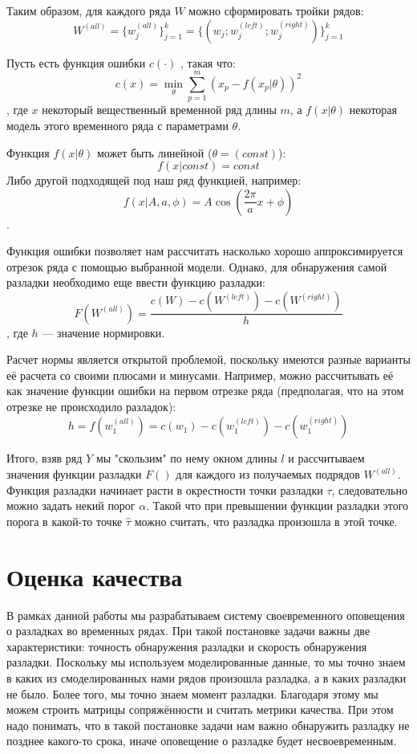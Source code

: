 \documentclass[%
12pt,
master,  %
natbib,      %
subf,        %
substylefile = spbu.rtx,
href,        %
colorlinks,  %
]{disser}
\begin{document}
Таким образом, для каждого ряда $W$ можно сформировать тройки рядов: 
$$ W^{(all)} = \{w_j^{(all)} \}_{j=1}^k =  \{(w_j; w_j^{(left)}; w_j^{(right)}) \}_{j=1}^k  $$

Пусть есть функция ошибки $c(\cdot)$ , такая что:
$$c(x) = \min_{\theta}{\sum_{p=1}^m(x_p - f(x_p | \theta))^2 }$$
, где $x$ некоторый вещественный временной ряд длины $m$, а $f(x | \theta)$ некоторая модель этого временного ряда с параметрами $\theta$.

Функция $f(x|\theta)$ может быть линейной ($\theta = (const)$):
$$ f(x | const) = const $$
Либо другой подходящей под наш ряд функцией, например:
$$ f(x | A, a, \phi) = A\cos(\frac{2\pi}{a}x + \phi) $$.

Функция ошибки позволяет нам рассчитать насколько хорошо аппроксимируется отрезок ряда с помощью выбранной модели. Однако, для обнаружения самой разладки необходимо еще ввести функцию разладки:
$$ F(W^{(all)}) = \frac{c(W) - c(W^{(left)}) - c(W^{(right)})}{h} $$
, где $h$ --- значение нормировки.


Расчет нормы является открытой проблемой, поскольку имеются разные варианты её расчета со своими плюсами и минусами.
Например, можно рассчитывать её как значение функции ошибки на первом отрезке ряда (предполагая, что на этом отрезке не происходило разладок):
$$ h = f(w_1^{(all)}) = c(w_1) - c(w_1^{(left)}) - c(w_1^{(right)})  $$

Итого, взяв ряд $Y$ мы "скользим" по нему окном длины $l$ и рассчитываем значения функции разладки $F()$ для каждого из получаемых подрядов $W^{(all)}$. Функция разладки начинает расти в окрестности точки разладки $\tau$, следовательно можно задать некий порог $\alpha$. Такой что при превышении функции разладки этого порога в какой-то точке $\hat{\tau}$ можно считать, что разладка произошла в этой точке.

\section{Оценка качества}

В рамках данной работы мы разрабатываем систему своевременного оповещения о разладках во временных рядах. При такой постановке задачи важны две характеристики: точность обнаружения разладки и скорость обнаружения разладки. Поскольку мы используем моделированные данные, то мы точно знаем в каких из смоделированных нами рядов произошла разладка, а в каких разладки не было. Более того, мы точно знаем момент разладки. Благодаря этому мы можем строить матрицы сопряжённости и считать метрики качества. При этом надо понимать, что в такой постановке задачи нам важно обнаружить разладку не позднее какого-то срока, иначе оповещение о разладке будет несвоевременным. 
\end{document}
